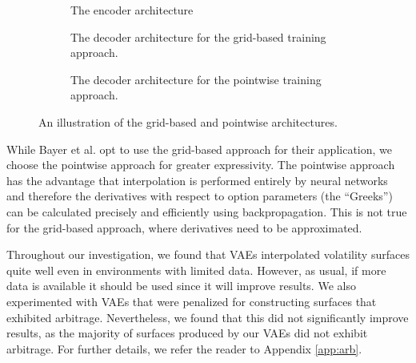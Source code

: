 \documentclass[12pt]{article}
\begin{document}
\begin{figure}[hp!]
\begin{subfigure}{\textwidth}
  \centering
\hspace*{-2.3cm}
  
\vspace{0.8em}
  \caption{The encoder architecture}
  \label{fig:encoder}
\end{subfigure}
\par\bigskip
\begin{subfigure}{\textwidth}
  \centering
\hspace*{1cm}
  
\vspace{0.8em}
  \caption{The decoder architecture for the grid-based training approach.}
  \label{fig:gridbased}
\end{subfigure}
\par\bigskip
\begin{subfigure}{\textwidth}
  \centering
\hspace*{1cm}
  
\vspace{0.8em}
  \caption{The decoder architecture for the pointwise training approach.}
  \label{fig:pointwise}
\end{subfigure}
\caption{An illustration of the grid-based and pointwise architectures.}
\label{fig:arch}
\end{figure}

While Bayer et al. opt to use the grid-based approach for their application, we choose the pointwise approach for greater expressivity. The pointwise approach has the advantage that interpolation is performed entirely by neural networks and therefore the derivatives with respect to option parameters (the ``Greeks'') can be calculated precisely and efficiently using backpropagation. This is not true for the grid-based approach, where derivatives need to be approximated. 

Throughout our investigation, we found that VAEs interpolated volatility surfaces quite well even in environments with limited data.  However, as usual, if more data is available it should be used since it will improve results. We also experimented with VAEs that were penalized for constructing surfaces that exhibited arbitrage. Nevertheless, we found that this did not significantly improve results, as the majority of surfaces produced by our VAEs did not exhibit arbitrage. For further details, we refer the reader to Appendix \ref{app:arb}.
\end{document}
